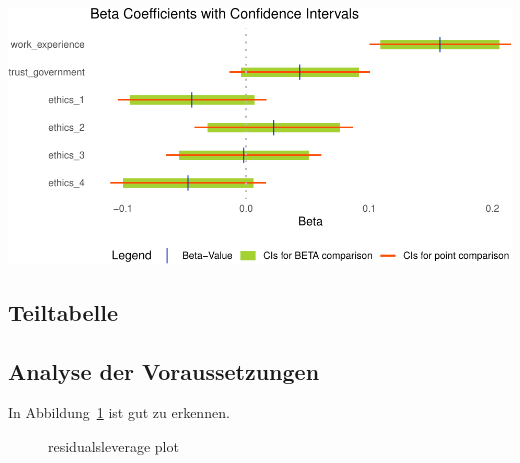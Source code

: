 \documentclass[
  a4paper,
  DIV=11,
  numbers=noendperiod]{scrartcl}
\begin{document}
\begin{center}
\includegraphics[width=0.85\linewidth,height=\textheight,keepaspectratio]{testthat_files/figure-pdf/unnamed-chunk-4-1.pdf}
\end{center}

\subsection{Teiltabelle}\label{teiltabelle}

\subsection{Analyse der
Voraussetzungen}\label{analyse-der-voraussetzungen}

In Abbildung~\ref{fig-reslev} ist gut zu erkennen.

\begin{figure}[H]


\caption{\label{fig-reslev}residualsleverage plot}

\end{figure}%
\end{document}
